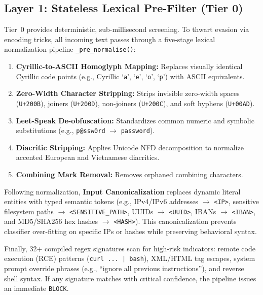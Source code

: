 \documentclass[conference]{IEEEtran}
\begin{document}
\subsection{Layer 1: Stateless Lexical Pre-Filter (Tier 0)}
Tier~0 provides deterministic, sub-millisecond screening. To thwart evasion via encoding tricks, all incoming text passes through a five-stage lexical normalization pipeline \texttt{\_pre\_normalise()}:
\begin{enumerate}[leftmargin=*]
    \item \textbf{Cyrillic-to-ASCII Homoglyph Mapping:} Replaces visually identical Cyrillic code points (e.g., Cyrillic `\texttt{а}', `\texttt{е}', `\texttt{о}', `\texttt{р}') with ASCII equivalents.
    \item \textbf{Zero-Width Character Stripping:} Strips invisible zero-width spaces (\texttt{U+200B}), joiners (\texttt{U+200D}), non-joiners (\texttt{U+200C}), and soft hyphens (\texttt{U+00AD}).
    \item \textbf{Leet-Speak De-obfuscation:} Standardizes common numeric and symbolic substitutions (e.g., \texttt{p@ssw0rd} $\to$ \texttt{password}).
    \item \textbf{Diacritic Stripping:} Applies Unicode NFD decomposition to normalize accented European and Vietnamese diacritics.
    \item \textbf{Combining Mark Removal:} Removes orphaned combining characters.
\end{enumerate}

Following normalization, \textbf{Input Canonicalization} replaces dynamic literal entities with typed semantic tokens (e.g., IPv4/IPv6 addresses $\to$ \texttt{<IP>}, sensitive filesystem paths $\to$ \texttt{<SENSITIVE\_PATH>}, UUIDs $\to$ \texttt{<UUID>}, IBANs $\to$ \texttt{<IBAN>}, and MD5/SHA256 hex hashes $\to$ \texttt{<HASH>}). This canonicalization prevents classifier over-fitting on specific IPs or hashes while preserving behavioral syntax.

Finally, 32+ compiled regex signatures scan for high-risk indicators: remote code execution (RCE) patterns (\texttt{curl\ ...\ |\ bash}), XML/HTML tag escapes, system prompt override phrases (e.g., ``ignore all previous instructions''), and reverse shell syntax. If any signature matches with critical confidence, the pipeline issues an immediate \texttt{BLOCK}.
\end{document}
